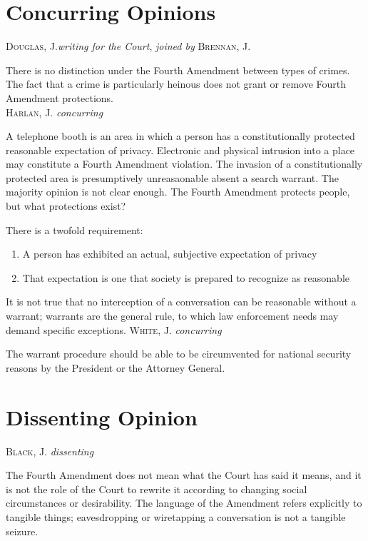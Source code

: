 \documentclass[paper=letter,fontsize=10pt]{article}
\begin{document}
\section{Concurring Opinions}
	\textsc{Douglas, J.}\textit{writing for the Court}, \textit{joined by} \textsc{Brennan, J.} \par
		There is no distinction under the Fourth Amendment between types of crimes.
		The fact that a crime is particularly heinous does not grant or remove Fourth Amendment protections. \\
	\noindent \textsc{Harlan, J.} \textit{concurring}\par
		A telephone booth is an area in which a person has a constitutionally protected reasonable expectation of privacy. Electronic and physical intrusion into a place may constitute a Fourth Amendment violation. The invasion of a constitutionally protected area is presumptively unreasaonable absent a search warrant. The majority opinion is not clear enough. The Fourth Amendment protects people, but what protections exist? \par
		There is a twofold requirement:
		\begin{enumerate}
			\item A person has exhibited an actual, subjective expectation of privacy
			\item That expectation is one that society is prepared to recognize as reasonable
		\end{enumerate}
		It is not true that no interception of a conversation can be reasonable without a warrant; warrants are the general rule, to which law enforcement needs may demand specific exceptions.
	\noindent \textsc{White, J.} \textit{concurring}\par
		The warrant procedure should be able to be circumvented for national security reasons by the President or the Attorney General.
\section{Dissenting Opinion}
	\noindent \textsc{Black, J.} \textit{dissenting}\par
		The Fourth Amendment does not mean what the Court has said it means, and it is not the role of the Court to rewrite it according to changing social circumstances or desirability. The language of the Amendment refers explicitly to tangible things; eavesdropping or wiretapping a conversation is not a tangible seizure.
\end{document}
